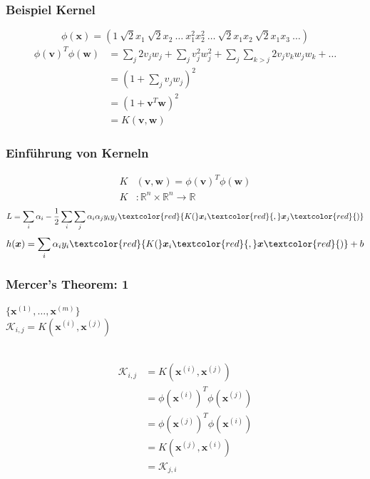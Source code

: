 	\begin{frame}
		\frametitle{Beispiel Kernel}
			\begin{equation*}
				\phi(\boldsymbol{x}) = (1 \ \sqrt{2}x_{1} \ \sqrt{2}x_{2} \ \dots \ x_{1}^{2}x_{2}^{2} \ \dots \ \sqrt{2}x_{1}x_{2} \ \sqrt{2}x_{1}x_{3} \ \dots)
			\end{equation*}
			\pause
			\begin{align*}
				\phi(\boldsymbol{v})^{T}\phi(\boldsymbol{w}) &= \sum_{j} 2v_{j}w_{j} + \sum_{j} v_{j}^{2} w_{j}^{2} + \sum_{j} \sum_{k > j} 2 v_{j} v_{k} w_{j} w_{k} + \dots \\
						&= (1+\sum_{j} v_{j} w_{j})^{2} \\
						&= (1+\boldsymbol{v}^{T} \boldsymbol{w})^{2} \\
						&= K(\boldsymbol{v}, \boldsymbol{w})
			\end{align*}
	\end{frame}
	
	\begin{frame}
		\frametitle{Einführung von Kerneln}
			\begin{align*}
				K&(\boldsymbol{v}, \boldsymbol{w}) = \phi(\boldsymbol{v})^{T} \phi(\boldsymbol{w})\\
				K&: \mathbb{R}^n \times \mathbb{R}^n \rightarrow \mathbb{R}
			\end{align*}
			\pause
			\begin{equation*}
				L = \sum_i \alpha_i - \frac{1}{2} \sum_i \sum_j \alpha_i \alpha_j y_i y_j \textcolor{red}{K(}\boldsymbol{x}_i\textcolor{red}{,} \boldsymbol{x}_j\textcolor{red}{)}
			\end{equation*}
			\begin{equation*}
				h(\boldsymbol{x}) = \sum_i \alpha_i y_i \textcolor{red}{K(}\boldsymbol{x}_i\textcolor{red}{,} \boldsymbol{x}\textcolor{red}{)} + b
			\end{equation*}
	\end{frame}
	
	\begin{frame}
		\frametitle{Mercer's Theorem: 1}
			$\{ \boldsymbol{x}^{(1)}, \dots, \boldsymbol{x}^{(m)} \}$ \\
			$\mathcal{K}_{i,j} = K(\boldsymbol{x}^{(i)}, \boldsymbol{x}^{(j)})$ \\\
			\pause
			
			\begin{align*}
				\mathcal{K}_{i,j} &= K(\boldsymbol{x}^{(i)}, \boldsymbol{x}^{(j)}) \\
								  &= \phi(\boldsymbol{x}^{(i)})^{T} \phi(\boldsymbol{x}^{(j)}) \\
								  &= \phi(\boldsymbol{x}^{(j)})^{T} \phi(\boldsymbol{x}^{(i)}) \\
								  &= K(\boldsymbol{x}^{(j)}, \boldsymbol{x}^{(i)}) \\
								  &= \mathcal{K}_{j,i}
			\end{align*}
	\end{frame}
	
